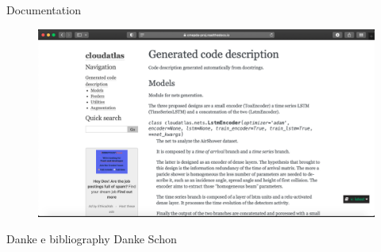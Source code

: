\documentclass{beamer}
\begin{document}
\begin{frame}{Documentation}
    \begin{figure}
        \centering
        \includegraphics[width=\textwidth]{figures/docs.png}
    \end{figure}
    
    \end{frame}
    

\begin{frame}{Danke e bibliography}
\centering
Danke Schon

    
\end{frame}
\end{document}
